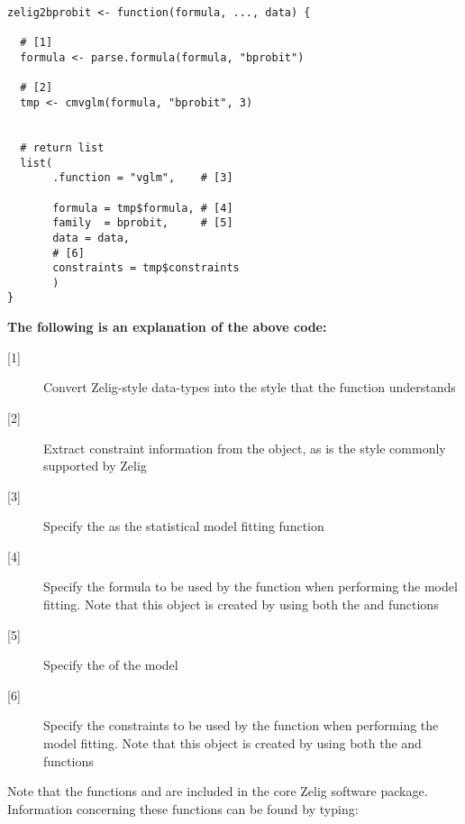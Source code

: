 %

\begin{verbatim}
zelig2bprobit <- function(formula, ..., data) {

  # [1]
  formula <- parse.formula(formula, "bprobit")
  
  # [2]
  tmp <- cmvglm(formula, "bprobit", 3)

  
  # return list
  list(
       .function = "vglm",    # [3]
       
       formula = tmp$formula, # [4]
       family  = bprobit,     # [5]
       data = data,
       # [6]
       constraints = tmp$constraints
       )
}
\end{verbatim}

{\noindent \bf The following is an explanation of the above code:}

%

\begin{description}

	\item[{[1]}] Convert Zelig-style  data-types into the style that the  function understands

	\item[{[2]}] Extract constraint information from the  object, as is the style commonly supported by Zelig

	\item[{[3]}] Specify the  as the statistical model fitting function

	\item[{[4]}] Specify the formula to be used by the  function when performing the model fitting. Note that this object is created by using both the  and  functions 

	\item[{[5]}] Specify the  of the model

	\item[{[6]}] Specify the constraints to be used by the  function when performing the model fitting. Note that this object is created by using both the  and  functions

\end{description}

%

\noindent Note that the functions  and  are included in the core Zelig software package. Information concerning these functions can be found by typing:


